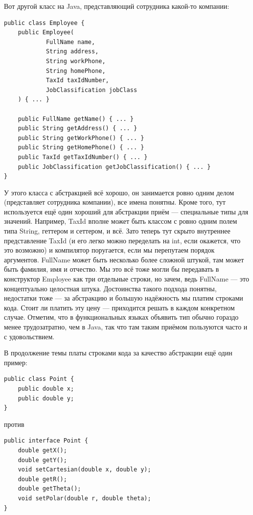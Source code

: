 \documentclass[a5paper]{article}
\begin{document}
Вот другой класс на Java, представляющий сотрудника какой-то компании:

\begin{verbatim}
public class Employee {
    public Employee(
            FullName name,
            String address,
            String workPhone,
            String homePhone,
            TaxId taxIdNumber,
            JobClassification jobClass
    ) { ... }

    public FullName getName() { ... }
    public String getAddress() { ... }
    public String getWorkPhone() { ... }
    public String getHomePhone() { ... }
    public TaxId getTaxIdNumber() { ... }
    public JobClassification getJobClassification() { ... }
}
\end{verbatim}

У этого класса с абстракцией всё хорошо, он занимается ровно одним делом (представляет сотрудника компании), все имена понятны. Кроме того, тут используется ещё один хороший для абстракции приём --- специальные типы для значений. Например, TaxId вполне может быть классом с ровно одним полем типа String, геттером и сеттером, и всё. Зато теперь тут скрыто внутреннее представление TaxId (и его легко можно переделать на int, если окажется, что это возможно) и компилятор поругается, если мы перепутаем порядок аргументов. FullName может быть несколько более сложной штукой, там может быть фамилия, имя и отчество. Мы это всё тоже могли бы передавать в конструктор Employee как три отдельные строки, но зачем, ведь FullName --- это концептуально целостная штука. Достоинства такого подхода понятны, недостатки тоже --- за абстракцию и большую надёжность мы платим строками кода. Стоит ли платить эту цену --- приходится решать в каждом конкретном случае. Отметим, что в функциональных языках объявить тип обычно гораздо менее трудозатратно, чем в Java, так что там таким приёмом пользуются часто и с удовольствием.

В продолжение темы платы строками кода за качество абстракции ещё один пример:

\begin{verbatim}
public class Point {
    public double x;
    public double y;
}
\end{verbatim}

против

\begin{verbatim}
public interface Point {
    double getX();
    double getY();
    void setCartesian(double x, double y);
    double getR();
    double getTheta();
    void setPolar(double r, double theta);
}
\end{verbatim}
\end{document}
